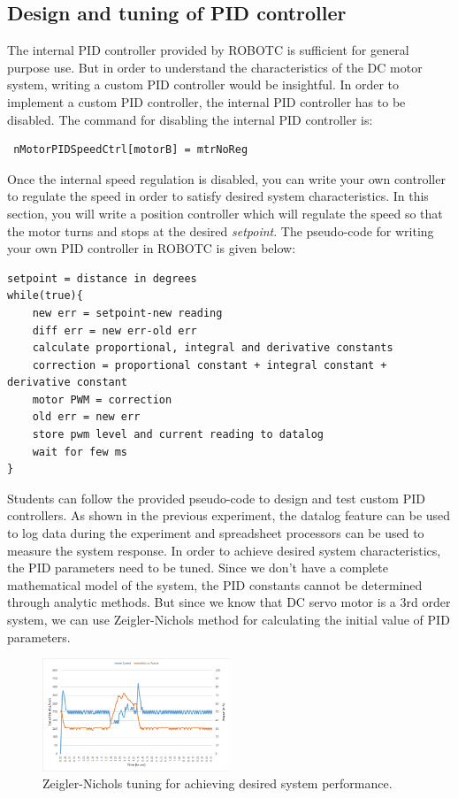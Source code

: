 \documentclass[paper=a4, fontsize=11pt]{scrartcl}
\numberwithin{equation}{section}        %
\numberwithin{figure}{section}          %
\numberwithin{table}{section}           %
\begin{document}
\subsection{Design and tuning of PID controller}
The internal PID controller provided by ROBOTC is sufficient for general purpose use. But in order to understand the characteristics of the DC motor system, writing a custom PID controller would be insightful. In order to implement a custom PID controller, the internal PID controller has to be disabled. The command for disabling the internal PID controller is:
\begin{verbatim}
 nMotorPIDSpeedCtrl[motorB] = mtrNoReg
\end{verbatim}
Once the internal speed regulation is disabled, you can  write your own controller to regulate the speed in order to satisfy desired system characteristics. In this section, you will write a position controller which will regulate the speed so that the motor turns and stops at the desired \emph{setpoint}. The pseudo-code for writing your own PID controller in ROBOTC is given below:
\begin{verbatim}
setpoint = distance in degrees
while(true){
	new err = setpoint-new reading
	diff err = new err-old err
	calculate proportional, integral and derivative constants
	correction = proportional constant + integral constant + derivative constant
	motor PWM = correction
	old err = new err
	store pwm level and current reading to datalog
	wait for few ms
}
\end{verbatim}
Students can follow the provided pseudo-code to design and test custom PID controllers. As shown in the previous experiment, the datalog feature can be used to log data during the experiment and spreadsheet processors can be used to measure the system response. In order to achieve desired system characteristics, the PID parameters need to be tuned. Since we don't have a complete mathematical model of the system, the PID constants cannot be determined through analytic methods. But since we know that DC servo motor is a 3rd order system, we can use Zeigler-Nichols method for calculating the initial value of PID parameters.

\begin{figure}[!hbp]
	\includegraphics[width=0.5\textwidth]{ZNTuning}
	\caption{Zeigler-Nichols tuning for achieving desired system performance.}
	\label{fig:ZNTuning}
\end{figure}
\end{document}

